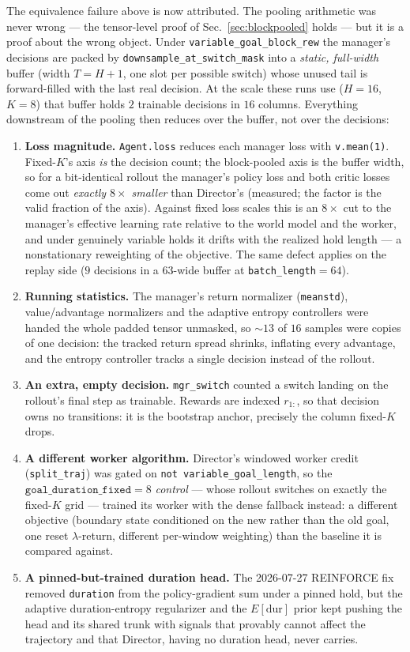 \documentclass[10pt]{article}
\begin{document}
The equivalence failure above is now attributed. The pooling arithmetic was
never wrong --- the tensor-level proof of Sec.~\ref{sec:blockpooled} holds ---
but it is a proof about the wrong object. Under \texttt{variable\_goal\_block\_rew}
the manager's decisions are packed by \texttt{downsample\_at\_switch\_mask}
into a \emph{static, full-width} buffer (width $T = H{+}1$, one slot per
possible switch) whose unused tail is forward-filled with the last real
decision. At the scale these runs use ($H{=}16$, $K{=}8$) that buffer holds
$2$ trainable decisions in $16$ columns. Everything downstream of the pooling
then reduces over the buffer, not over the decisions:

\begin{enumerate}
\item \textbf{Loss magnitude.} \texttt{Agent.loss} reduces each manager loss
with \texttt{v.mean(1)}. Fixed-$K$'s axis \emph{is} the decision count; the
block-pooled axis is the buffer width, so for a bit-identical rollout the
manager's policy loss and both critic losses come out \emph{exactly $8\times$
smaller} than Director's (measured; the factor is the valid fraction of the
axis). Against fixed loss scales this is an $8\times$ cut to the manager's
effective learning rate relative to the world model and the worker, and under
genuinely variable holds it drifts with the realized hold length --- a
nonstationary reweighting of the objective. The same defect applies on the
replay side ($9$ decisions in a $63$-wide buffer at \texttt{batch\_length}$=64$).
\item \textbf{Running statistics.} The manager's return normalizer
(\texttt{meanstd}), value/advantage normalizers and the adaptive entropy
controllers were handed the whole padded tensor unmasked, so $\sim\!13$ of
$16$ samples were copies of one decision: the tracked return spread shrinks,
inflating every advantage, and the entropy controller tracks a single
decision instead of the rollout.
\item \textbf{An extra, empty decision.} \texttt{mgr\_switch} counted a switch
landing on the rollout's final step as trainable. Rewards are indexed
$r_{1:}$, so that decision owns no transitions: it is the bootstrap anchor,
precisely the column fixed-$K$ drops.
\item \textbf{A different worker algorithm.} Director's windowed worker credit
(\texttt{split\_traj}) was gated on \texttt{not variable\_goal\_length}, so the
$\texttt{goal\_duration\_fixed}{=}8$ \emph{control} --- whose rollout switches
on exactly the fixed-$K$ grid --- trained its worker with the dense fallback
instead: a different objective (boundary state conditioned on the new rather
than the old goal, one reset $\lambda$-return, different per-window weighting)
than the baseline it is compared against.
\item \textbf{A pinned-but-trained duration head.} The 2026-07-27 REINFORCE fix
removed \texttt{duration} from the policy-gradient sum under a pinned hold, but
the adaptive duration-entropy regularizer and the $E[\mathrm{dur}]$ prior kept
pushing the head and its shared trunk with signals that provably cannot affect
the trajectory and that Director, having no duration head, never carries.
\end{enumerate}
\end{document}
